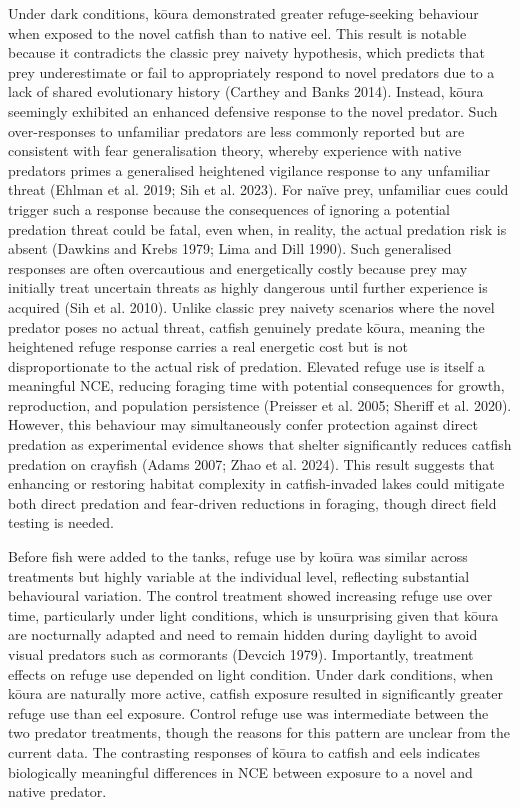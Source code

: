 \documentclass[
  12pt,
  a4paper,
  oneside]{scrbook}
\begin{document}
Under dark conditions, kōura demonstrated greater refuge-seeking
behaviour when exposed to the novel catfish than to native eel. This
result is notable because it contradicts the classic prey naivety
hypothesis, which predicts that prey underestimate or fail to
appropriately respond to novel predators due to a lack of shared
evolutionary history (Carthey and Banks 2014). Instead, kōura seemingly
exhibited an enhanced defensive response to the novel predator. Such
over-responses to unfamiliar predators are less commonly reported but
are consistent with fear generalisation theory, whereby experience with
native predators primes a generalised heightened vigilance response to
any unfamiliar threat (Ehlman et al. 2019; Sih et al. 2023). For naïve
prey, unfamiliar cues could trigger such a response because the
consequences of ignoring a potential predation threat could be fatal,
even when, in reality, the actual predation risk is absent (Dawkins and
Krebs 1979; Lima and Dill 1990). Such generalised responses are often
overcautious and energetically costly because prey may initially treat
uncertain threats as highly dangerous until further experience is
acquired (Sih et al. 2010). Unlike classic prey naivety scenarios where
the novel predator poses no actual threat, catfish genuinely predate
kōura, meaning the heightened refuge response carries a real energetic
cost but is not disproportionate to the actual risk of predation.
Elevated refuge use is itself a meaningful NCE, reducing foraging time
with potential consequences for growth, reproduction, and population
persistence (Preisser et al. 2005; Sheriff et al. 2020). However, this
behaviour may simultaneously confer protection against direct predation
as experimental evidence shows that shelter significantly reduces
catfish predation on crayfish (Adams 2007; Zhao et al. 2024). This
result suggests that enhancing or restoring habitat complexity in
catfish-invaded lakes could mitigate both direct predation and
fear-driven reductions in foraging, though direct field testing is
needed.

Before fish were added to the tanks, refuge use by koūra was similar
across treatments but highly variable at the individual level,
reflecting substantial behavioural variation. The control treatment
showed increasing refuge use over time, particularly under light
conditions, which is unsurprising given that kōura are nocturnally
adapted and need to remain hidden during daylight to avoid visual
predators such as cormorants (Devcich 1979). Importantly, treatment
effects on refuge use depended on light condition. Under dark
conditions, when kōura are naturally more active, catfish exposure
resulted in significantly greater refuge use than eel exposure. Control
refuge use was intermediate between the two predator treatments, though
the reasons for this pattern are unclear from the current data. The
contrasting responses of kōura to catfish and eels indicates
biologically meaningful differences in NCE between exposure to a novel
and native predator.
\end{document}
